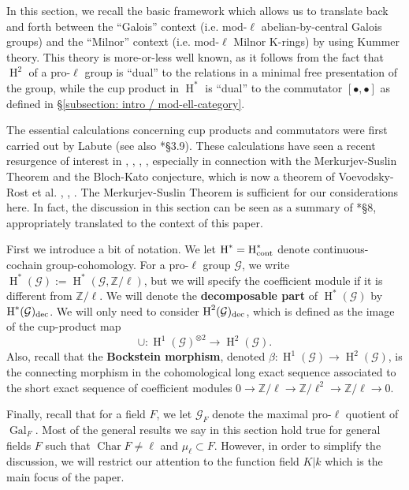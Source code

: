 \documentclass[11pt]{amsart}
\theoremstyle{definition}
\theoremstyle{remark}
\numberwithin{equation}{section}
\DeclareMathOperator{\Gal}{Gal}
\DeclareMathOperator{\Char}{Char}
\renewcommand{\H}{\operatorname{H}}
\newcommand{\Z}{\mathbb{Z}}
\newcommand{\Gc}{\mathcal{G}}
\begin{document}

In this section, we recall the basic framework which allows us to translate back and forth between the ``Galois'' context (i.e. mod-$\ell$ abelian-by-central Galois groups) and the ``Milnor'' context (i.e. mod-$\ell$ Milnor K-rings) by using Kummer theory.
This theory is more-or-less well known, as it follows from the fact that $\H^2$ of a pro-$\ell$ group is ``dual'' to the relations in a minimal free presentation of the group, while the cup product in $\H^*$ is ``dual'' to the commutator $[\bullet,\bullet]$ as defined in \S\ref{subsection: intro / mod-ell-category}.

The essential calculations concerning cup products and commutators were first carried out by {\sc Labute} \cite{Labute:1967} (see also \cite{Neukirch:2013}*{\S3.9}).
These calculations have seen a recent resurgence of interest in \cite{Chebolu:2012}, \cite{Efrat:2015}, \cite{Efrat:2011}, \cite{Topaz:2015b}, especially in connection with the Merkurjev-Suslin Theorem \cite{Merkurjev:1982} and the Bloch-Kato conjecture, which is now a theorem of {\sc Voevodsky-Rost} et al. \cite{Voevodsky:2011}, \cite{Rost:1998}, \cite{Weibel:2009}.
The Merkurjev-Suslin Theorem is sufficient for our considerations here.
In fact, the discussion in this section can be seen as a summary of \cite{Topaz:2014}*{\S8}, appropriately translated to the context of this paper.

First we introduce a bit of notation.
We let $\H^* = \H^*_{\rm cont}$ denote continuous-cochain group-cohomology.
For a pro-$\ell$ group $\Gc$, we write $\H^*(\Gc) := \H^*(\Gc,\Z/\ell)$, but we will specify the coefficient module if it is different from $\Z/\ell$.
We will denote the {\bf decomposable part} of $\H^*(\Gc)$ by $\H^*(\Gc)_{\rm dec}$.
We will only need to consider $\H^2(\Gc)_{\rm dec}$, which is defined as the image of the cup-product map
\[ \cup : \H^1(\Gc)^{\otimes 2} \rightarrow \H^2(\Gc). \]
Also, recall that the {\bf Bockstein morphism}, denoted $\beta : \H^1(\Gc) \rightarrow \H^2(\Gc)$, is the connecting morphism in the cohomological long exact sequence associated to the short exact sequence of coefficient modules $0 \rightarrow \Z/\ell \rightarrow \Z/\ell^2 \rightarrow \Z/\ell \rightarrow 0$.

Finally, recall that for a field $F$, we let $\Gc_F$ denote the maximal pro-$\ell$ quotient of $\Gal_F$.
Most of the general results we say in this section hold true for general fields $F$ such that $\Char F \neq \ell$ and $\mu_\ell \subset F$.
However, in order to simplify the discussion, we will restrict our attention to the function field $K|k$ which is the main focus of the paper.
\end{document}
